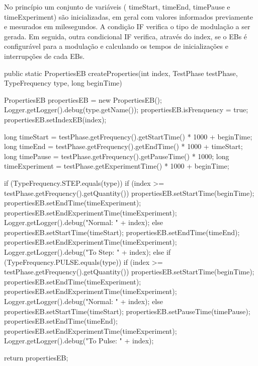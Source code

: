 No princípio um conjunto de variáveis ( \textsf{timeStart}, \textsf{timeEnd}, \textsf{timePause} e \textsf{timeExperiment}) são inicializadas, em geral com valores informados previamente e mesurados em milesegundos. A condição IF verifica o tipo de modulação a ser gerada. Em seguida, outra condicional IF verifica, através do index, se o EBs é configurável para a modulação e calculando os tempos de inicializações e interrupções de cada EBs.

\begin{codigo}[caption={Algoritmo calcula os tempos de inicialização e termino para cada um dos Clientes}, label={code:createProperties}, breaklines=true]
	public static PropertiesEB createProperties(int index, TestPhase testPhase, TypeFrequency type, long beginTime) {
		
		PropertiesEB propertiesEB = new PropertiesEB();
		Logger.getLogger().debug(type.getName());
		propertiesEB.isFrenquency = true;
		propertiesEB.setIndexEB(index);
		
		long timeStart = testPhase.getFrequency().getStartTime() * 1000 + beginTime;
		long timeEnd   = testPhase.getFrequency().getEndTime() * 1000 + timeStart;
		long timePause = testPhase.getFrequency().getPauseTime() * 1000;
		long timeExperiment = testPhase.getExperimentTime() * 1000 + beginTime;
		
		if (TypeFrequency.STEP.equals(type)) {
			if (index >= testPhase.getFrequency().getQuantity()) {
				propertiesEB.setStartTime(beginTime);
				propertiesEB.setEndTime(timeExperiment);
				propertiesEB.setEndExperimentTime(timeExperiment);
				Logger.getLogger().debug("Normal: " + index);
			} else {
			propertiesEB.setStartTime(timeStart);
			propertiesEB.setEndTime(timeEnd);
			propertiesEB.setEndExperimentTime(timeExperiment);
			Logger.getLogger().debug("To Step: " + index);
		}
	} else if (TypeFrequency.PULSE.equals(type)) {
	if (index >= testPhase.getFrequency().getQuantity()) {
		propertiesEB.setStartTime(beginTime);
		propertiesEB.setEndTime(timeExperiment);
		propertiesEB.setEndExperimentTime(timeExperiment);
		Logger.getLogger().debug("Normal: " + index);
	} else {
	propertiesEB.setStartTime(timeStart);
	propertiesEB.setPauseTime(timePause);
	propertiesEB.setEndTime(timeEnd);
	propertiesEB.setEndExperimentTime(timeExperiment);
	Logger.getLogger().debug("To Pulse: " + index);
}
}

return propertiesEB;

}

\end{codigo}

